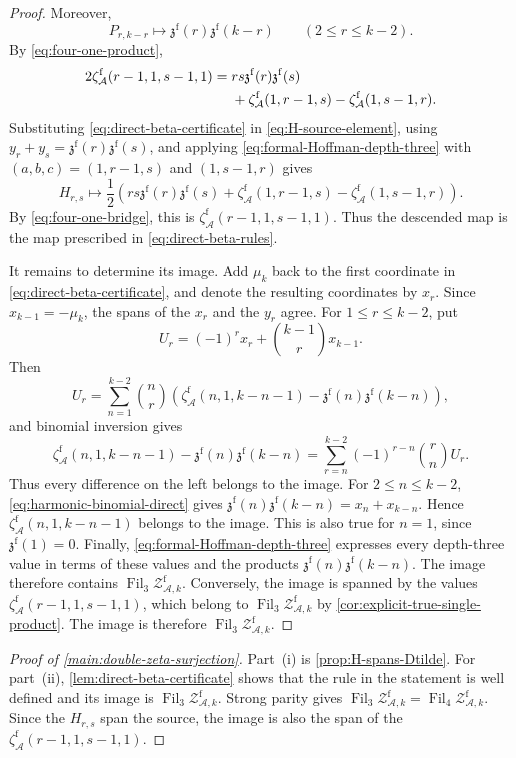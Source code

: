 \documentclass[12pt]{amsart}
\numberwithin{equation}{section}
\theoremstyle{plain}
\DeclareMathOperator{\Fil}{Fil}
\newcommand{\ZAfw}[1]{{\mathcal Z_{\mathcal A,#1}^{\mathrm f}}}
\newcommand{\zaf}[1]{\zeta_{\mathcal A}^{\mathrm f}(#1)}
\newcommand{\zzf}[1]{\mathfrak z^{\mathrm f}(#1)}
\begin{document}
\begin{proof}
Moreover,
\[
 P_{r,k-r}\longmapsto\zzf r\zzf{k-r}
 \qquad(2\leq r\leq k-2).
\]
By
\eqref{eq:four-one-product},
\begin{align}\label{eq:four-one-bridge}
 2\zaf{r-1,1,s-1,1}={}&rs\zzf r\zzf s\notag\\
 &+\zaf{1,r-1,s}-\zaf{1,s-1,r}.
\end{align}
Substituting \eqref{eq:direct-beta-certificate} in
\eqref{eq:H-source-element}, using
$y_r+y_s=\zzf r\zzf s$, and applying
\eqref{eq:formal-Hoffman-depth-three} with
$(a,b,c)=(1,r-1,s)$ and $(1,s-1,r)$ gives
\[
 H_{r,s}\longmapsto\frac12\left(
 rs\zzf r\zzf s+\zaf{1,r-1,s}-\zaf{1,s-1,r}
 \right).
\]
By \eqref{eq:four-one-bridge}, this is
$\zaf{r-1,1,s-1,1}$. Thus the descended map is the map prescribed
in \eqref{eq:direct-beta-rules}.

It remains to determine its image. Add $\mu_k$ back to the first
coordinate in \eqref{eq:direct-beta-certificate}, and denote the
resulting coordinates by $x_r$. Since $x_{k-1}=-\mu_k$, the spans of
the $x_r$ and the $y_r$ agree. For $1\leq r\leq k-2$, put
\[
 U_r=(-1)^rx_r+\binom{k-1}{r}x_{k-1}.
\]
Then
\[
 U_r=\sum_{n=1}^{k-2}\binom nr
 \left(\zaf{n,1,k-n-1}-\zzf n\zzf{k-n}\right),
\]
and binomial inversion gives
\[
 \zaf{n,1,k-n-1}-\zzf n\zzf{k-n}
 =\sum_{r=n}^{k-2}(-1)^{r-n}\binom rnU_r.
\]
Thus every difference on the left belongs to the image. For
$2\leq n\leq k-2$, \eqref{eq:harmonic-binomial-direct} gives
$\zzf n\zzf{k-n}=x_n+x_{k-n}$. Hence
$\zaf{n,1,k-n-1}$ belongs to the image. This is also true for $n=1$,
since $\zzf 1=0$. Finally,
\eqref{eq:formal-Hoffman-depth-three} expresses every depth-three value
in terms of these values and the products $\zzf n\zzf{k-n}$. The image
therefore contains $\Fil_3\ZAfw{k}$. Conversely, the image is spanned
by the values $\zaf{r-1,1,s-1,1}$, which belong to $\Fil_3\ZAfw{k}$ by
\cref{cor:explicit-true-single-product}. The image is therefore
$\Fil_3\ZAfw{k}$.
\end{proof}

\begin{proof}[Proof of \cref{main:double-zeta-surjection}]
Part~(i) is \cref{prop:H-spans-Dtilde}. For part~(ii),
\cref{lem:direct-beta-certificate} shows that the rule in the statement is
well defined and its image is $\Fil_3\ZAfw{k}$. Strong parity gives
$\Fil_3\ZAfw{k}=\Fil_4\ZAfw{k}$. Since the $H_{r,s}$ span the source, the
image is also the span of the $\zaf{r-1,1,s-1,1}$.
\end{proof}
\end{document}
